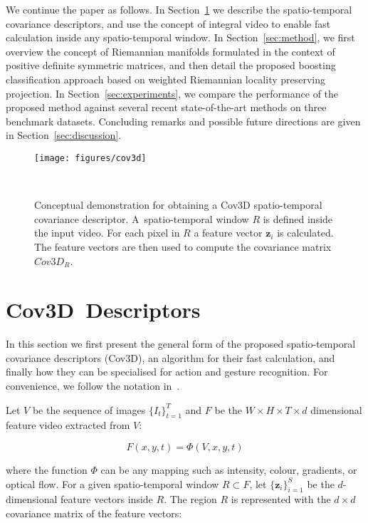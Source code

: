 \documentclass[10pt,twocolumn,letterpaper]{article}
\newcommand{\eqsize}{\footnotesize}
\newcommand{\cov}{{Cov3D}}
\newcommand{\vect}[1]{{\boldsymbol{#1}}}
\begin{document}
We continue the paper as follows.
In Section~\ref{sec:cov3d} we describe the spatio-temporal covariance descriptors,
and use the concept of integral video to enable fast calculation inside any spatio-temporal window.
In Section~\ref{sec:method}, we first overview the concept of Riemannian manifolds formulated in the context of positive definite symmetric matrices,
and then detail the proposed boosting classification approach based on weighted Riemannian locality preserving projection.
In Section~\ref{sec:experiments}, we compare the performance of the proposed method against several recent state-of-the-art methods
on three benchmark datasets.
Concluding remarks and possible future directions are given in Section~\ref{sec:discussion}.
\begin{figure}[!b]
  \centering
  \texttt{[image: figures/cov3d]}
  
  ~
  
  \caption
    {
    \small
    Conceptual demonstration for obtaining a {\cov} spatio-temporal covariance descriptor.
    A~spatio-temporal window {\eqsize $R$} is defined inside the input video.
    For each pixel in {\eqsize $R$} a feature vector {\eqsize $\vect{z}_i$} is calculated.
    The feature vectors are then used to compute the covariance matrix {\eqsize $\cov_R$}.
    }
  \label{fig:cov3d}
\end{figure}


\section{\cov~Descriptors}
\label{sec:cov3d}

In this section we first present the general form of the proposed spatio-temporal covariance descriptors (\cov),
an algorithm for their fast calculation,
and finally how they can be specialised for action and gesture recognition.
For convenience, we follow the notation in~\cite{TuzelEtAl2008}.

Let {\eqsize $V$} be the sequence of images {\eqsize ${\{I_t\}}_{t=1}^{T}$}
and {\eqsize $F$} be the {\eqsize $W  \times H \times T \times d$} dimensional feature video extracted from {\eqsize $V$}:

\vspace{-1ex}
\eqsize
\begin{equation}
  F(x,y,t) = \Phi(V,x,y,t)
  \label{eq:feature_mapping}
\end{equation}
\normalsize

\noindent
where the function {\eqsize $\Phi$} can be any mapping such as intensity, colour, gradients, or optical flow.
For a given spatio-temporal window {\eqsize $R \subset F$},
let {\eqsize ${\{\vect{z}_i\}}_{i=1}^{S}$} be the {\eqsize $d$}-dimensional feature vectors inside {\eqsize $R$}.
The region {\eqsize $R$} is represented with the
{\eqsize $d \times d$} covariance matrix of the feature vectors:
\end{document}
